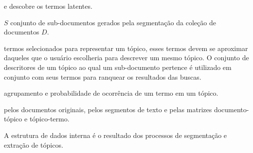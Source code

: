 



















e descobre os termos latentes. 




$S$ conjunto de sub-documentos gerados pela segmentação da coleção de documentos $D$.







termos selecionados para representar um tópico, esses termos devem se aproximar daqueles que o usuário escolheria para descrever um mesmo tópico. O conjunto de descritores de um tópico ao qual um sub-documento pertence é utilizado em conjunto com seus termos para ranquear os resultados das buscas.


agrupamento e probabilidade de ocorrência de um termo em um tópico.

pelos documentos originais, pelos segmentos de texto e pelas matrizes documento-tópico e tópico-termo.








A estrutura de dados interna é o resultado dos processos de segmentação e extração de tópicos.









